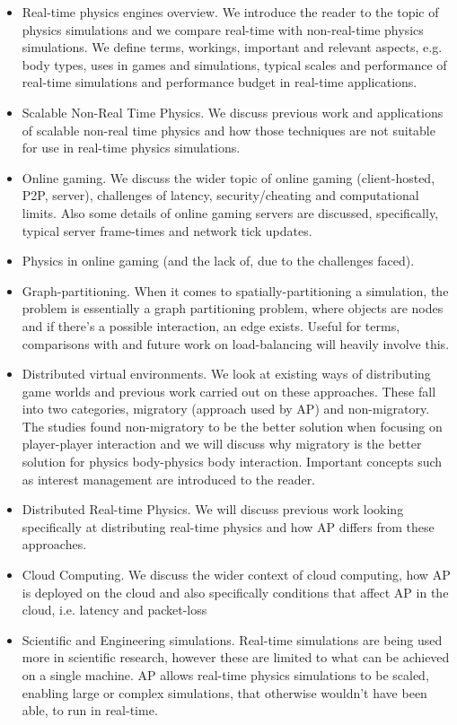 \begin{itemize}
	\item Real-time physics engines overview. We introduce the reader to the topic of physics simulations and we compare real-time with non-real-time physics simulations. We define terms, workings, important and relevant aspects, e.g. body types, uses in games and simulations, typical scales and performance of real-time simulations and performance budget in real-time applications.
	\item Scalable Non-Real Time Physics. We discuss previous work and applications of scalable non-real time physics and how those techniques are not suitable for use in real-time physics simulations.
	\item Online gaming. We discuss the wider topic of online gaming (client-hosted, P2P, server), challenges of latency, security/cheating and computational limits. Also some details of online gaming servers are discussed, specifically, typical server frame-times and network tick updates. 
	\item Physics in online gaming (and the lack of, due to the challenges faced).
	\item Graph-partitioning. When it comes to spatially-partitioning a simulation, the problem is essentially a graph partitioning problem, where objects are nodes and if there’s a possible interaction, an edge exists. Useful for terms, comparisons with and future work on load-balancing will heavily involve this.
	\item Distributed virtual environments. We look at existing ways of distributing game worlds and previous work carried out on these approaches. These fall into two categories, migratory (approach used by AP) and non-migratory. The studies found non-migratory to be the better solution when focusing on player-player interaction and we will discuss why migratory is the better solution for physics body-physics body interaction. Important concepts such as interest management are introduced to the reader.
	\item Distributed Real-time Physics. We will discuss previous work looking specifically at distributing real-time physics and how AP differs from these approaches.
	\item Cloud Computing. We discuss the wider context of cloud computing, how AP is deployed on the cloud and also specifically conditions that affect AP in the cloud, i.e. latency and packet-loss
	\item Scientific and Engineering simulations. Real-time simulations are being used more in scientific research, however these are limited to what can be achieved on a single machine. AP allows real-time physics simulations to be scaled, enabling large or complex simulations, that otherwise wouldn't have been able, to run in real-time.

\end{itemize}
